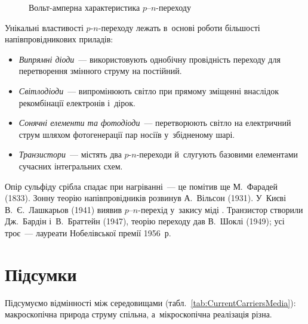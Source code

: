 \begin{figure}[h!]\centering
	\caption{Вольт-амперна характеристика $p$--$n$-переходу\label{pic:PNIV}}
\end{figure}

Унікальні властивості $p$-$n$-переходу лежать в~основі роботи більшості напівпровідникових
приладів:
\begin{itemize}
	\item \emph{Випрямні діоди}~--- використовують однобічну провідність переходу для
	  перетворення змінного струму на постійний.
	\item \emph{Світлодіоди}~--- випромінюють світло при прямому зміщенні внаслідок
	  рекомбінації електронів і~дірок.
	\item \emph{Сонячні елементи та фотодіоди}~--- перетворюють світло на електричний
	  струм шляхом фотогенерації пар носіїв у~збідненому шарі.
	\item \emph{Транзистори}~--- містять два $p$-$n$-переходи й~слугують базовими
	  елементами сучасних інтегральних схем.
\end{itemize}

\begin{Historical}
	Опір сульфіду срібла  спадає при нагріванні~--- це помітив ще М.~Фарадей
	(1833). Зонну теорію напівпровідників розвинув А.~Вільсон (1931). У~Києві
	В.~Є.~Лашкарьов (1941) виявив $p$--$n$-перехід у~закису міді . Транзистор
	створили Дж.~Бардін і~В.~Браттейн (1947), теорію переходу дав В.~Шоклі (1949); усі
	троє~--- лауреати Нобелівської премії 1956~р.
\end{Historical}


\section*{Підсумки}


 {}

Підсумуємо відмінності між середовищами (табл.~\ref{tab:CurrentCarriersMedia}):
макроскопічна природа струму спільна, а~мікроскопічна реалізація різна.

